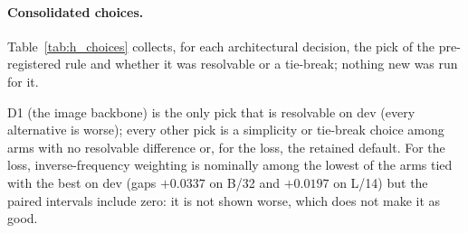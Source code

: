 \paragraph{Consolidated choices.}
Table~\ref{tab:h_choices} collects, for each architectural decision, the pick of the pre-registered rule and whether it was resolvable or a tie-break; nothing new was run for it.
\begin{table}[t]
\centering
\small
\setlength{\tabcolsep}{3pt}
\caption{Consolidated choices (Task 2): for each decision, the pick of the pre-registered rule, the best arm on dev (mean dev macro-F1 over three seeds), the best arm minus the pick with its paired dev 95\% interval, and whether the pick was resolvable or a tie-break. The loss row compares the image-only head on L/14 (the imbalance study used its own rule). (a) The hyperparameter pick (dev 0.6083, test 0.6350) is nominally below the default d\_model 256 (dev 0.6124, test 0.6438) and was chosen on simplicity, not improvement.}
\label{tab:h_choices}
\end{table}
D1 (the image backbone) is the only pick that is resolvable on dev (every alternative is worse); every other pick is a simplicity or tie-break choice among arms with no resolvable difference or, for the loss, the retained default.
For the loss, inverse-frequency weighting is nominally among the lowest of the arms tied with the best on dev (gaps $+0.0337$ on B/32 and $+0.0197$ on L/14) but the paired intervals include zero: it is not shown worse, which does not make it as good.
